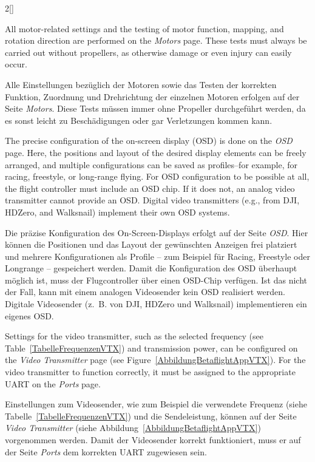 \begin{paracol}{2}[]
\colstart

All motor-related settings and the testing of motor function, mapping, and rotation direction are performed on the \textsl{Motors} page. These tests must always be carried out without propellers, as otherwise damage or even injury can easily occur.

\colger

Alle Einstellungen bezüglich der Motoren sowie das Testen der korrekten Funktion, Zuordnung und Drehrichtung der einzelnen Motoren erfolgen auf der Seite \textsl{Motors}. Diese Tests müssen immer ohne Propeller durchgeführt werden, da es sonst leicht zu Beschädigungen oder gar Verletzungen kommen kann.

\coleng

The precise configuration of the on-screen display (OSD) is done on the \textsl{OSD} page. Here, the positions and layout of the desired display elements can be freely arranged, and multiple configurations can be saved as profiles--for example, for racing, freestyle, or long-range flying. For OSD configuration to be possible at all, the flight controller must include an OSD chip. If it does not, an analog video transmitter cannot provide an OSD. Digital video transmitters (e.g., from DJI, HDZero, and Walksnail) implement their own OSD systems.

\colger

Die präzise Konfiguration des On-Screen-Displays erfolgt auf der Seite \textsl{OSD}. Hier können die Positionen und das Layout der gewünschten Anzeigen frei platziert und mehrere Konfigurationen als Profile -- zum Beispiel für Racing, Freestyle oder Longrange -- gespeichert werden. Damit die Konfiguration des OSD überhaupt möglich ist, muss der Flugcontroller über einen OSD-Chip verfügen. Ist das nicht der Fall, kann mit einem analogen Videosender kein OSD realisiert werden. Digitale Videosender (z.~B. von DJI, HDZero und Walksnail) implementieren ein eigenes OSD.

\coleng

Settings for the video transmitter, such as the selected frequency (see Table~\ref{TabelleFrequenzenVTX}) and transmission power, can be configured on the \textsl{Video Transmitter} page (see Figure~\ref{AbbildungBetaflightAppVTX}). For the video transmitter to function correctly, it must be assigned to the appropriate UART on the \textsl{Ports} page.

\colger

Einstellungen zum Videosender, wie zum Beispiel die verwendete Frequenz (siehe Tabelle~\ref{TabelleFrequenzenVTX}) und die Sendeleistung, können auf der Seite \textsl{Video Transmitter} (siehe Abbildung~\ref{AbbildungBetaflightAppVTX}) vorgenommen werden. Damit der Videosender korrekt funktioniert, muss er auf der Seite \textsl{Ports} dem korrekten UART zugewiesen sein. 


\end{paracol}
